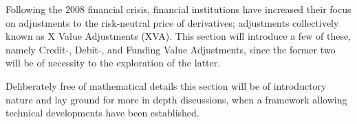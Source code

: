 \documentclass[../../../main.tex]{subfiles}
\begin{document}
    Following the 2008 financial crisis,
    financial institutions have increased their focus on 
    adjustments to the risk-neutral price of derivatives;
    adjustments collectively known as X Value Adjustments (XVA).
    This section will introduce a few of these, 
    namely Credit-, Debit-, and Funding Value Adjustments,
    since the former two will be of necessity to the exploration of the latter.

    Deliberately free of mathematical details this section will be of introductory nature 
    and lay ground for more in depth discussions, 
    when a framework allowing technical developments have been established.
\end{document}

